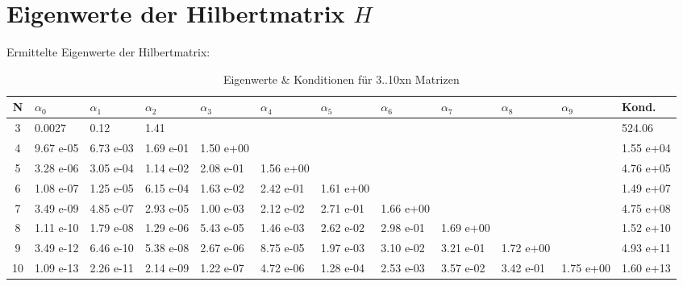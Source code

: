\documentclass{beamer}
\begin{document}
  \section{Eigenwerte der Hilbertmatrix $H$}
  \begin{frame}
    Ermittelte Eigenwerte der Hilbertmatrix:
    \centering    
    \begin{table}[htbp]
    \tiny   
    \begin{tabularx}{\textwidth}{|c|X|X|X|X|X|X|X|X|X|X|X|}
        \hline    
        N & $\alpha_0$&$\alpha_1$&$\alpha_2$&$\alpha_3$&$\alpha_4$&$\alpha_5$&$\alpha_6$&$\alpha_7$&$\alpha_8$&$\alpha_9$& Kond.\\\hline
        3 & 0.0027 & 0.12 & 1.41 &&&&&&&& 524.06\\\hline
        4 & 9.67 e-05 & 6.73 e-03 & 1.69 e-01 & 1.50 e+00 &&&&&&& 1.55 e+04\\\hline
        5 & 3.28 e-06 & 3.05 e-04 & 1.14 e-02 & 2.08 e-01 & 1.56 e+00 &&&&&& 4.76 e+05\\\hline
        6 & 1.08 e-07 & 1.25 e-05 & 6.15 e-04 & 1.63 e-02 & 2.42 e-01 & 1.61 e+00 &&&&& 1.49 e+07\\\hline
        7 & 3.49 e-09 & 4.85 e-07 & 2.93 e-05 & 1.00 e-03 & 2.12 e-02 & 2.71 e-01 & 1.66 e+00 &&&& 4.75 e+08\\\hline
        8 & 1.11 e-10 & 1.79 e-08 & 1.29 e-06 & 5.43 e-05 & 1.46 e-03 & 2.62 e-02 & 2.98 e-01 & 1.69 e+00 &&& 1.52 e+10\\\hline
        9 & 3.49 e-12 & 6.46 e-10 & 5.38 e-08 & 2.67 e-06 & 8.75 e-05 & 1.97 e-03 & 3.10 e-02 & 3.21 e-01 & 1.72 e+00 && 4.93 e+11\\\hline
        10& 1.09 e-13 & 2.26 e-11 & 2.14 e-09 & 1.22 e-07 & 4.72 e-06 & 1.28 e-04 & 2.53 e-03 & 3.57 e-02 & 3.42 e-01 & 1.75 e+00 & 1.60 e+13\\\hline
    \end{tabularx}
    \caption{Eigenwerte \& Konditionen für 3..10xn Matrizen \label{tab:task3}}      
    \end{table}
  \end{frame}
\end{document}
